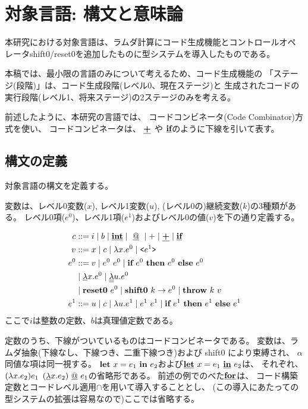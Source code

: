 
\section{対象言語: 構文と意味論}

本研究における対象言語は、ラムダ計算にコード生成機能とコントロールオペ
レータshift0/reset0を追加したものに型システムを導入したものである。

本稿では、最小限の言語のみについて考えるため、コード生成機能の
「ステージ(段階)」は、コード生成段階(レベル0、現在ステージ)と
生成されたコードの実行段階(レベル1、将来ステージ)の2ステージのみを考える。

前述したように、本研究の言語では、
コードコンビネータ(Code Combinator)方式を使い、
コードコンビネータは、
$\underline{\textbf{+}}$ や $\underline{\textbf{if}}$のように下線を引いて表す。

\subsection{構文の定義}

対象言語の構文を定義する。

変数は、レベル0変数($x$), レベル1変数($u$),
(レベル0の)継続変数($k$)の3種類がある。
レベル0項($e^0$)、レベル1項($e^1$)およびレベル0の値($v$)を下の通り定義する。

\begin{align*}
  c & ::= i \mid b \mid \underline{\textbf{int}} 
         \mid ~\underline{@}~ \mid + \mid \underline{\textbf{+}} \mid \underline{\textbf{if}} \\
  v & ::= x \mid c \mid \lambda{x}.{e^0} \mid \texttt{<}{e^1}\texttt{>} \\
  e^0 & ::=  v  \mid e^0~ e^0 \mid \textbf{if}~{e^0}~\textbf{then}~{e^0}~\textbf{else}~{e^0} \\
    & \mid \underline{\lambda}{x}.{e^0}
      \mid \underline{\underline{\lambda}}{u}.{e^0} \\
    & \mid \textbf{reset0}~{e^0}
      \mid \textbf{shift0}~{k}\to{e^0}
      \mid \textbf{throw}~{k}~{v} \\
  e^1 & ::=  u \mid c \mid \lambda{u}.{e^1} \mid e^1~ e^1 
      \mid \textbf{if}~{e^1}~\textbf{then}~{e^1}~\textbf{else}~{e^1} \\
\end{align*}
ここで$i$は整数の定数、$b$は真理値定数である。

定数のうち、下線がついているものはコードコンビネータである。
変数は、ラムダ抽象(下線なし、下線つき、二重下線つき)および shift0 により束縛され、
$\alpha$同値な項は同一視する。
$\textbf{let}~{x}={e_1}~\textbf{in}~{e_2}$および$\underline{\textbf{let}}~{x}={e_1}~\underline{\textbf{in}}~{e_2}$は、
それぞれ、$(\lambda{x}.{e_2})e_1$
$(\underline{\lambda}{x}.{e_2})~\underline{@}~ e_1$の省略形である。
前述の例でのべた$\underline{\textbf{for}}$は、
コード構築定数とコードレベル適用$\cap$を用いて導入することとし、
(この導入にあたっての型システムの拡張は容易なので)ここでは省略する。

